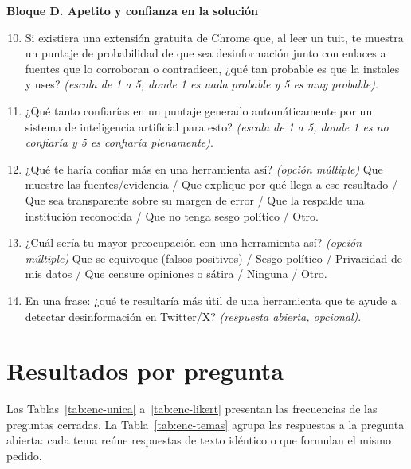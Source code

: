 \textbf{Bloque D. Apetito y confianza en la solución}

\begin{enumerate}\setcounter{enumi}{9}
  \item Si existiera una extensión gratuita de Chrome que, al leer un tuit, te muestra un puntaje de probabilidad de que sea desinformación junto con enlaces a fuentes que lo corroboran o contradicen, ¿qué tan probable es que la instales y uses? \emph{(escala de 1 a 5, donde 1 es nada probable y 5 es muy probable)}.
  \item ¿Qué tanto confiarías en un puntaje generado automáticamente por un sistema de inteligencia artificial para esto? \emph{(escala de 1 a 5, donde 1 es no confiaría y 5 es confiaría plenamente)}.
  \item ¿Qué te haría confiar más en una herramienta así? \emph{(opción múltiple)} Que muestre las fuentes/evidencia / Que explique por qué llega a ese resultado / Que sea transparente sobre su margen de error / Que la respalde una institución reconocida / Que no tenga sesgo político / Otro.
  \item ¿Cuál sería tu mayor preocupación con una herramienta así? \emph{(opción múltiple)} Que se equivoque (falsos positivos) / Sesgo político / Privacidad de mis datos / Que censure opiniones o sátira / Ninguna / Otro.
  \item En una frase: ¿qué te resultaría más útil de una herramienta que te ayude a detectar desinformación en Twitter/X? \emph{(respuesta abierta, opcional)}.
\end{enumerate}

\section*{Resultados por pregunta}

Las Tablas~\ref{tab:enc-unica} a~\ref{tab:enc-likert} presentan las frecuencias de las preguntas cerradas. La Tabla~\ref{tab:enc-temas} agrupa las respuestas a la pregunta abierta: cada tema reúne respuestas de texto idéntico o que formulan el mismo pedido.


